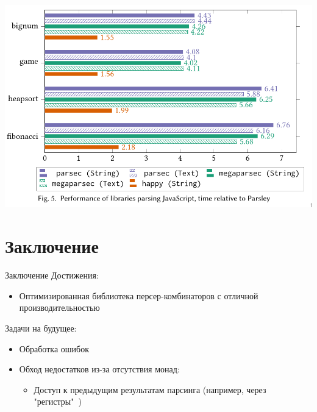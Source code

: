 \documentclass[aspectratio=169
  , xcolor={svgnames}
  , hyperref={ colorlinks,citecolor=Blue
             , linkcolor=DarkRed,urlcolor=DarkBlue}
  , usenames, dvipsnames
  , russian
  ]{beamer}
\begin{document}
\begin{frame}[fragile]
\begin{center}
\includegraphics[scale=.5]{pictures/benchmark2Screen.png}
\end{center}
\end{frame}


\section{Заключение}

\begin{frame}{Заключение}
\Large
Достижения:
\begin{itemize}
\item Оптимизированная библиотека персер-комбинаторов с отличной производительностью
\end{itemize}

Задачи на будущее:
\begin{itemize}
\item Обработка ошибок
\item Обход недостатков из-за отсутствия монад:
\begin{itemize}\large
\item Доступ к предыдущим результатам парсинга (например, через "регистры"~\cite{berlin2020})
\end{itemize}
\end{itemize}

\end{frame}

\end{document}
